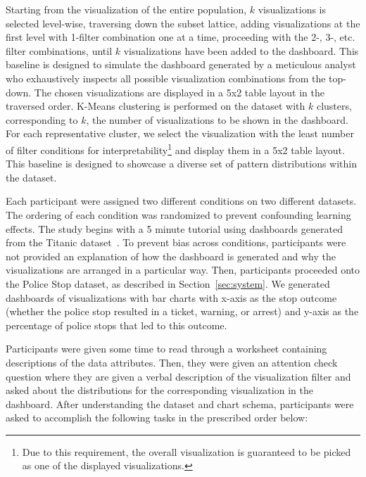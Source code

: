 \stitle{\BFS:} Starting from the visualization of the entire population, $k$ visualizations is selected level-wise, traversing down the subset lattice, adding visualizations at the first level with 1-filter combination one at a time, proceeding with the 2-, 3-, etc. filter combinations, until $k$ visualizations have been added to the dashboard. This baseline is designed to simulate the dashboard generated by a meticulous analyst who exhaustively inspects all possible visualization combinations from the top-down. The chosen visualizations are displayed in a 5x2 table layout in the traversed order.
\stitle{\cluster:} K-Means clustering is performed on the dataset with $k$ clusters, corresponding to $k$, the number of visualizations to be shown in the dashboard. For each representative cluster, we select the visualization with the least number of filter conditions for interpretability\footnote{Due to this requirement, the overall visualization is guaranteed to be picked as one of the displayed visualizations.} and display them in a 5x2 table layout. This baseline is designed to showcase a diverse set of pattern distributions within the dataset.
\par Each participant were assigned two different conditions on two different datasets. The ordering of each condition was randomized to prevent confounding learning effects.%
The study begins with a 5 minute tutorial using dashboards generated from the Titanic dataset~\cite{titanic}. To prevent bias across conditions, participants were not provided an explanation of how the dashboard is generated and why the visualizations are arranged in a particular way. Then, participants proceeded onto the Police Stop dataset, as described in Section~\ref{sec:system}.%
We generated dashboards of visualizations with bar charts with x-axis as the stop outcome (whether the police stop resulted in a ticket, warning, or arrest) and y-axis as the percentage of police stops that led to this outcome. 
\par Participants were given some time to read through a worksheet containing descriptions of the data attributes. Then, they were given an attention check question where they are given a verbal description of the visualization filter and asked about the distributions for the corresponding visualization in the dashboard. After understanding the dataset and chart schema, participants were asked to accomplish the following tasks in the prescribed order below:
